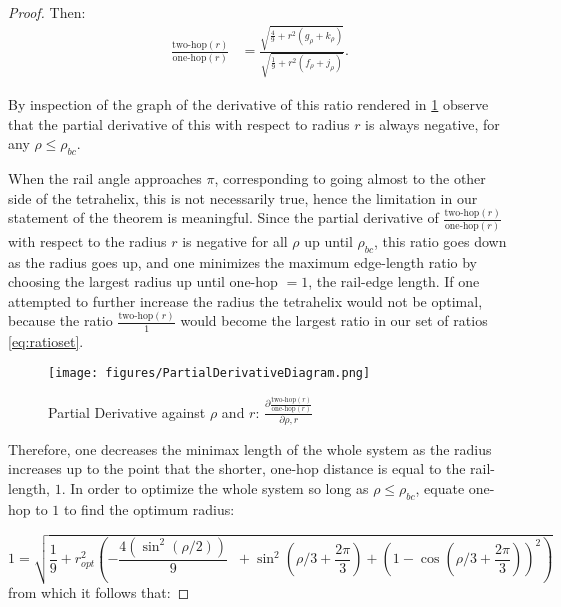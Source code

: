 \documentclass[10pt,final]{journals-1.0/asme2ej}
\begin{document}
\begin{proof}
Then:
\begin{equation}
  \begin{split}
  \frac{\text{two-hop}(r)}{ \text{one-hop}(r)}  &=
  \frac{\sqrt{\frac{4}{9}  + r^2(g_{\rho}+ k_{\rho})}}
       {\sqrt{\frac{1}{9} +r^2(f_{\rho}+j_{\rho}) }} \text{.}
  \end{split}       
\end{equation}



  By inspection of the graph of the derivative of this ratio rendered in \cref{fig:partialderivativediagram}
  observe that the partial derivative of this with respect to
radius $r$ is always negative, for any $\rho \leq \rho_{bc}$.

When the rail angle approaches
$\pi$, corresponding to going almost to the other side of the tetrahelix, this is not necessarily true, hence the
limitation in our statement of the theorem is meaningful.
Since the partial derivative of  $\frac{\text{two-hop}(r)}{\text{one-hop}(r)}$ with respect to the
radius $r$ is negative for all $\rho$ up until $\rho_{bc}$, this ratio goes down
as the radius goes up, and 
one minimizes the maximum edge-length ratio by choosing the largest radius
up until one-hop $= 1$, the rail-edge length. If one attempted to further increase the radius
the tetrahelix would not be optimal,
because the ratio $\frac{\text{two-hop}(r)}{1}$ would become the
largest ratio in our set of ratios \cref{eq:ratioset}.

\begin{figure}
     \centering
     \texttt{[image: figures/PartialDerivativeDiagram.png]}
     \caption{Partial Derivative against $\rho$ and $r$: $ \frac{\partial \frac{\text{two-hop}(r)}{ \text{one-hop}(r)}}{\partial \rho, r} $ }
  \label{fig:partialderivativediagram}
\end{figure}

Therefore, one decreases the minimax length
of the whole system as the radius increases
up to the point that the shorter, one-hop distance is equal to the rail-length, $1$.
In order to optimize the whole system so long as $\rho \leq \rho_{bc}$,
equate one-hop to $1$ to find the optimum radius:

\begin{equation}
  1 =  \sqrt{
      \frac{1}{9}   +   r_{opt}^2(-\frac{4 (\sin^2( \rho / 2))}{9} \; \;+ \sin^2(\rho/3+ \frac{2\pi}{3}) + (1 - \cos(\rho/3 + \frac{2\pi}{3}))^2) 
    }
\end{equation}    
from which it follows that:


\end{proof}
\end{document}
